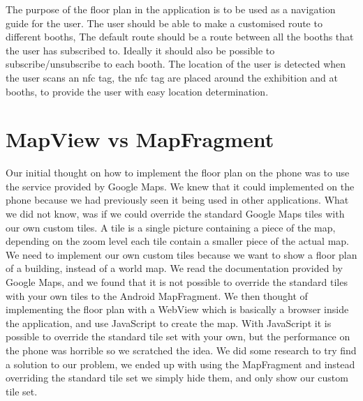 The purpose of the floor plan in the application is to be used as a navigation guide for the user. The user should be able to make a customised route to different booths, The default route should be a route between all the booths that the user has subscribed to.
Ideally it should also be possible to subscribe/unsubscribe to each booth. The location of the user is detected when the user scans an \ac{nfc} tag, the \ac{nfc} tag are placed around the exhibition and at booths, to provide the user with easy location determination.

\section{MapView vs MapFragment}
Our initial thought on how to implement the floor plan on the phone was to use the service provided by Google Maps. We knew that it could implemented on the phone because we had previously seen it being used in other applications. What we did not know, was if we could override the standard Google Maps tiles with our own custom tiles. A tile is a single picture containing a piece of the map, depending on the zoom level each tile contain a smaller piece of the actual map.\\
We need to implement our own custom tiles because we want to show a floor plan of a building, instead of a world map. We read the documentation provided by Google Maps, and we found that it is not possible to override the standard tiles with your own tiles to the Android MapFragment. We then thought of implementing the floor plan with a WebView which is basically a browser inside the application, and use JavaScript to create the map. With JavaScript it is possible to override the standard tile set with your own, but the performance on the phone was horrible so we scratched the idea.
We did some research to try find a solution to our problem, we ended up with using the MapFragment and instead overriding the standard tile set we simply hide them, and only show our custom tile set.

